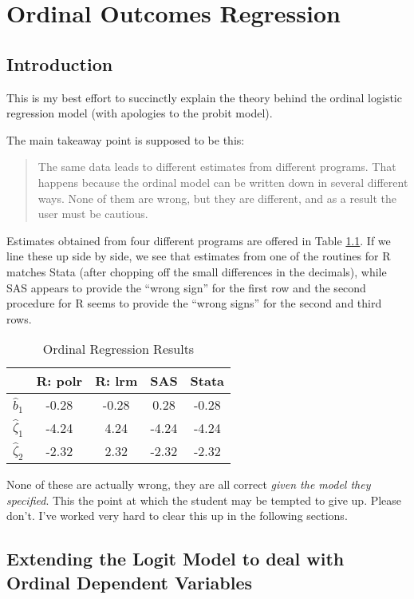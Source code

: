
\chapter{Ordinal Outcomes Regression}

\section{Introduction}

This is my best effort to succinctly explain the theory behind the
ordinal logistic regression model (with apologies to the probit model). 

The main takeaway point is supposed to be this: 
\begin{quote}
The same data leads to different estimates from different programs.
That happens because the ordinal model can be written down in several
different ways. None of them are wrong, but they are different, and
as a result the user must be cautious.
\end{quote}
Estimates obtained from four different programs are offered in Table
\ref{tab:Ordinal-Regression-Results}. If we line these up side by
side, we see that estimates from one of the routines for R matches
Stata (after chopping off the small differences in the decimals),
while SAS appears to provide the ``wrong sign'' for the first row
and the second procedure for R seems to provide the ``wrong signs''
for the second and third rows.

\begin{table}

\caption{Ordinal Regression Results\label{tab:Ordinal-Regression-Results}}

\centering{}%
\begin{tabular}{|c|c|c|c|c|}
\hline 
 & R: polr & R: lrm & SAS & Stata\tabularnewline
\hline 
\hline 
$\hat{b}_{1}$ & -0.28 & -0.28 & 0.28 & -0.28\tabularnewline
\hline 
$\hat{\zeta}_{1}$ & -4.24 & 4.24 & -4.24 & -4.24\tabularnewline
\hline 
$\hat{\zeta}_{2}$ & -2.32 & 2.32 & -2.32 & -2.32\tabularnewline
\hline 
\end{tabular}
\end{table}

\noindent None of these are actually wrong, they are all correct \emph{given
the model they specified}. This the point at which the student may
be tempted to give up. Please don't. I've worked very hard to clear
this up in the following sections.

\section{Extending the Logit Model to deal with Ordinal Dependent Variables}

